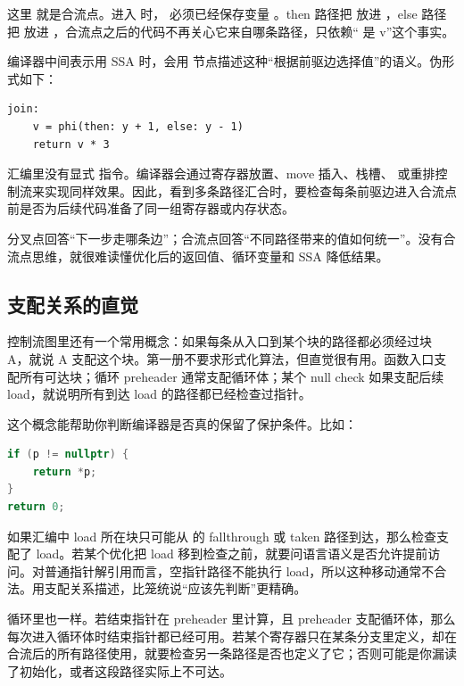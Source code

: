 这里  就是合流点。进入  时， 必须已经保存变量 。then 路径把  放进 ，else 路径把  放进 ，合流点之后的代码不再关心它来自哪条路径，只依赖“ 是 v”这个事实。

编译器中间表示用 SSA 时，会用  节点描述这种“根据前驱边选择值”的语义。伪形式如下：

\begin{lstlisting}
join:
    v = phi(then: y + 1, else: y - 1)
    return v * 3
\end{lstlisting}

汇编里没有显式  指令。编译器会通过寄存器放置、move 插入、栈槽、 或重排控制流来实现同样效果。因此，看到多条路径汇合时，要检查每条前驱边进入合流点前是否为后续代码准备了同一组寄存器或内存状态。

\begin{mentalmodel}
分叉点回答“下一步走哪条边”；合流点回答“不同路径带来的值如何统一”。没有合流点思维，就很难读懂优化后的返回值、循环变量和 SSA 降低结果。
\end{mentalmodel}

\subsection{支配关系的直觉}

控制流图里还有一个常用概念：如果每条从入口到某个块的路径都必须经过块 A，就说 A 支配这个块。第一册不要求形式化算法，但直觉很有用。函数入口支配所有可达块；循环 preheader 通常支配循环体；某个 null check 如果支配后续 load，就说明所有到达 load 的路径都已经检查过指针。

这个概念能帮助你判断编译器是否真的保留了保护条件。比如：

\begin{lstlisting}[language=C++]
if (p != nullptr) {
    return *p;
}
return 0;
\end{lstlisting}

如果汇编中 load 所在块只可能从  的 fallthrough 或 taken 路径到达，那么检查支配了 load。若某个优化把 load 移到检查之前，就要问语言语义是否允许提前访问。对普通指针解引用而言，空指针路径不能执行 load，所以这种移动通常不合法。用支配关系描述，比笼统说“应该先判断”更精确。

循环里也一样。若结束指针在 preheader 里计算，且 preheader 支配循环体，那么每次进入循环体时结束指针都已经可用。若某个寄存器只在某条分支里定义，却在合流后的所有路径使用，就要检查另一条路径是否也定义了它；否则可能是你漏读了初始化，或者这段路径实际上不可达。

